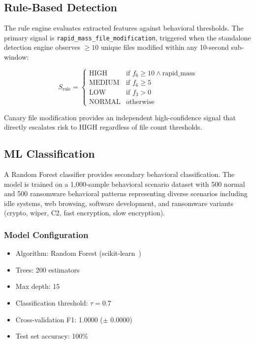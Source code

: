 \documentclass[conference]{IEEEtran}
\begin{document}
\subsection{Rule-Based Detection}

The rule engine evaluates extracted features against
behavioral thresholds. The primary signal is
\texttt{rapid\_mass\_file\_modification}, triggered when the
standalone detection engine observes $\geq 10$ unique files
modified within any 10-second sub-window:

\begin{equation}
S_{\text{rule}} = \begin{cases}
\text{HIGH} & \text{if } f_6 \geq 10 \wedge
              \text{rapid\_mass} \\
\text{MEDIUM} & \text{if } f_6 \geq 5 \\
\text{LOW} & \text{if } f_3 > 0 \\
\text{NORMAL} & \text{otherwise}
\end{cases}
\end{equation}

Canary file modification provides an independent high-confidence
signal that directly escalates risk to HIGH regardless of file
count thresholds.

\subsection{ML Classification}

A Random Forest classifier \cite{breiman2001} provides secondary
behavioral classification. The model is trained on a
1,000-sample behavioral scenario dataset with 500 normal and
500 ransomware behavioral patterns representing diverse
scenarios including idle systems, web browsing, software
development, and ransomware variants (crypto, wiper, C2,
fast encryption, slow encryption).

\subsubsection{Model Configuration}
\begin{itemize}
    \item Algorithm: Random Forest (scikit-learn~\cite{sklearn})
    \item Trees: 200 estimators
    \item Max depth: 15
    \item Classification threshold: $\tau = 0.7$
    \item Cross-validation F1: 1.0000 ($\pm$ 0.0000)
    \item Test set accuracy: 100\%
\end{itemize}
\end{document}
